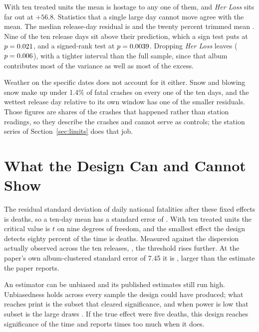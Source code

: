 \documentclass[11pt]{article}
\begin{document}
With ten treated units the mean is hostage to any one of them, and \emph{Her Loss} sits far out at
$+56.8$. Statistics that a single large day cannot move agree with the mean. The median release-day
residual is \numMedianEffect{} and the twenty percent trimmed mean \numTrimmedEffect{}. Nine of the
ten release days sit above their prediction, which a sign test puts at $p = 0.021$, and a
signed-rank test at $p = 0.0039$. Dropping \emph{Her Loss} leaves
\numEffectDropMostInfluential{} ($p = 0.006$), with a tighter interval than the
full sample, since that album contributes most of the variance as well as most of the excess.

Weather on the specific dates does not account for it either. Snow and blowing snow make up under
1.4\% of fatal crashes on every one of the ten days, and the wettest release day relative to its
own window has one of the smaller residuals. Those figures are shares of the crashes that happened rather
than station readings, so they describe the crashes and cannot serve as controls; the station
series of Section~\ref{sec:limits} does that job.

\section{What the Design Can and Cannot Show}
\label{sec:design}

The residual standard deviation of daily national fatalities after these fixed effects is
\numResidSD{} deaths, so a ten-day mean has a standard error of \numSENull{}. With ten treated
units the critical value is $t$ on nine degrees of freedom, and the smallest effect the design
detects eighty percent of the time is \numMDEEighty{} deaths. Measured against the dispersion
actually observed across the ten releases, \numSERealized{}, the threshold rises further. At the
paper's own album-clustered standard error of 7.45 it is \numMDEEightyClustered{}, larger than the
estimate the paper reports.



An estimator can be unbiased and its published estimates still run high. Unbiasedness holds across
every sample the design could have produced; what reaches print is the subset that cleared
significance, and when power is low that subset is the large draws \citep{gelman2014beyond}. If
the true effect were five deaths, this design reaches significance
\numPowerAtFive{} of the time and reports \numExaggerationAtFive{} times too much when it does.
\end{document}

